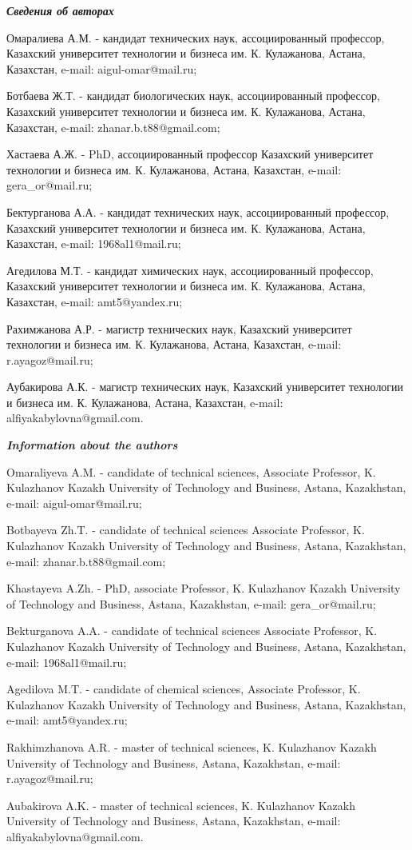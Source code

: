 \begin{info}
\hspace{1em}\emph{{\bfseries Сведения об авторах}}

Омаралиева А.М. - кандидат технических наук, ассоциированный
профессор, Казахский университет технологии и бизнеса
им. К. Кулажанова, Астана, Казахстан, e-mail: aigul-omar@mail.ru;

Ботбаева Ж.Т. - кандидат биологических наук, ассоциированный
профессор, Казахский университет технологии и бизнеса
им. К. Кулажанова, Астана, Казахстан, e-mail: zhanar.b.t88@gmail.com;

Хастаева А.Ж. - PhD, ассоциированный профессор Казахский университет
технологии и бизнеса им. К. Кулажанова, Астана, Казахстан, e-mail:
gera\_or@mail.ru;

Бектурганова А.А. - кандидат технических наук, ассоциированный
профессор, Казахский университет технологии и бизнеса
им. К. Кулажанова, Астана, Казахстан, e-mail: 1968al1@mail.ru;

Агедилова М.Т. - кандидат химических наук, ассоциированный профессор,
Казахский университет технологии и бизнеса им. К. Кулажанова, Астана,
Казахстан, e-mail: amt5@yandex.ru;

Рахимжанова А.Р. - магистр технических наук, Казахский университет
технологии и бизнеса им. К. Кулажанова, Астана, Казахстан, e-mail:
r.ayagoz@mail.ru;

Аубакирова А.К. - магистр технических наук, Казахский университет
технологии и бизнеса им. К. Кулажанова, Астана, Казахстан, e-mail:
alfiyakabylovna@gmail.com.

\hspace{1em}\emph{{\bfseries Information about the authors}}

Omaraliyeva A.M. - candidate of technical sciences, Associate
Professor, K. Kulazhanov Kazakh University of Technology and Business,
Astana, Kazakhstan, e-mail: aigul-omar@mail.ru;

Botbayeva Zh.T. - candidate of technical sciences Associate Professor,
K. Kulazhanov Kazakh University of Technology and Business, Astana,
Kazakhstan, e-mail: zhanar.b.t88@gmail.com;

Khastayeva A.Zh. - PhD, associate Professor, K. Kulazhanov Kazakh
University of Technology and Business, Astana, Kazakhstan, e-mail:
gera\_or@mail.ru;

Bekturganova A.A. - candidate of technical sciences Associate
Professor, K. Kulazhanov Kazakh University of Technology and Business,
Astana, Kazakhstan, e-mail: 1968al1@mail.ru;

Agedilova M.T. - candidate of chemical sciences, Associate Professor,
K.  Kulazhanov Kazakh University of Technology and Business, Astana,
Kazakhstan, e-mail: amt5@yandex.ru;

Rakhimzhanova A.R. - master of technical sciences, K. Kulazhanov
Kazakh University of Technology and Business, Astana, Kazakhstan,
e-mail: r.ayagoz@mail.ru;

Aubakirova A.K. - master of technical sciences, K. Kulazhanov Kazakh
University of Technology and Business, Astana, Kazakhstan, e-mail:
alfiyakabylovna@gmail.com.
\end{info}
